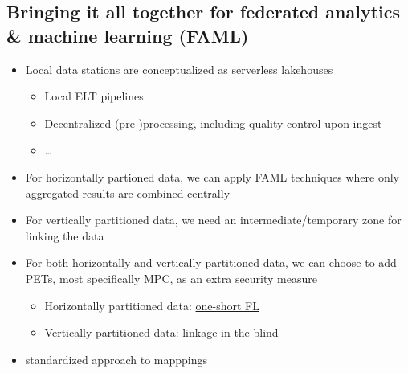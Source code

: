 \documentclass[
  letterpaper,
  DIV=11,
  numbers=noendperiod]{scrartcl}
\providecommand{\tightlist}{%
  \setlength{\itemsep}{0pt}\setlength{\parskip}{0pt}}\usepackage{longtable,booktabs,array}
\begin{document}
\subsection{Bringing it all together for federated analytics \& machine
learning
(FAML)}\label{bringing-it-all-together-for-federated-analytics-machine-learning-faml}

\begin{itemize}
\tightlist
\item
  Local data stations are conceptualized as serverless lakehouses

  \begin{itemize}
  \tightlist
  \item
    Local ELT pipelines
  \item
    Decentralized (pre-)processing, including quality control upon
    ingest
  \item
    \ldots{}
  \end{itemize}
\item
  For horizontally partioned data, we can apply FAML techniques where
  only aggregated results are combined centrally
\item
  For vertically partitioned data, we need an intermediate/temporary
  zone for linking the data
\item
  For both horizontally and vertically partitioned data, we can choose
  to add PETs, most specifically MPC, as an extra security measure

  \begin{itemize}
  \tightlist
  \item
    Horizontally partitioned data:
    \href{https://rosemanlabs.com/en/blogs/privacy-safe-federated-learning}{one-short
    FL}
  \item
    Vertically partitioned data: linkage in the blind
  \end{itemize}
\item
  standardized approach to mapppings
\end{itemize}
\end{document}
